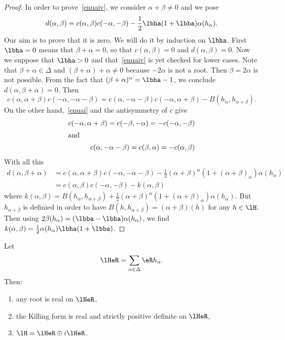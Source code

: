 \begin{proof}
	In order to prove~\ref{enuaiv}, we consider $\alpha+\beta\neq0$ and we pose
	\[
		d(\alpha,\beta)=c(\alpha,\beta)c(-\alpha,-\beta)-\frac{1}{2}\lbha(1+\lbba)\alpha(h_{\alpha}).
	\]
	Our aim is to prove that it is zero. We will do it by induction on $\lbha$. First $\lbha=0$ means that $\beta+\alpha=0$, so that $c(\alpha,\beta)=0$ and $d(\alpha,\beta)=0$. Now we suppose that $\lbha>0$ and that~\ref{enuaiv} is yet checked for lower cases. Note that $\beta+\alpha\in \Delta$ and $(\beta+\alpha)+\alpha\neq 0$ because $-2\alpha$ is not a root. Then $\beta=2\alpha$ is not possible. From the fact that $(\beta+\alpha)^{\alpha}=\lbha-1$, we conclude $d(\alpha,\beta+\alpha)=0$. Then
	\[
		c(\alpha,\alpha+\beta)c(-\alpha,-\alpha-\beta)=c(\alpha,-\alpha-\beta)c(-\alpha,\alpha+\beta)-B(h_{\alpha},h_{\alpha+\beta}).
	\]
	On the other hand,~\ref{enuai} and the antisymmetry of $c$ give
	\begin{subequations}
		\begin{align}
			c(-\alpha,\alpha+\beta)=c(-\beta,-\alpha)=-c(-\alpha,-\beta) \\
			\intertext{and}
			c(\alpha,-\alpha-\beta)=c(\beta,\alpha)=-c(\alpha,\beta)
		\end{align}
	\end{subequations}
	With all this
	\begin{equation}
		\begin{split}
			d(\alpha,\beta+\alpha)&=c(\alpha,\alpha+\beta)c(-\alpha,-\alpha-\beta)-\frac{1}{2}(\alpha+\beta)^{\alpha}(1+(\alpha+\beta)_{\alpha})\alpha(h_{\alpha})\\
			&=c(\alpha,\beta)c(-\alpha,-\beta)-k(\alpha,\beta)
		\end{split}
	\end{equation}
	where $k(\alpha,\beta)=B(h_{\alpha},h_{\alpha+\beta})+\frac{1}{2}(\alpha+\beta)^{\alpha}(1+(\alpha+\beta)_{\alpha})\alpha(h_{\alpha})$. But $h_{\alpha+\beta}$ is definied in order to have $B(h,h_{\alpha+\beta})=(\alpha+\beta)(h)$ for any $h\in\lH$. Then using $2\beta(h_{\alpha})=(\lbba-\lbha)\alpha(h_{\alpha})$, we find $k(\alpha,\beta)=\frac{1}{2}\alpha(h_{\alpha})\lbha(1+\lbba)$.
\end{proof}

\begin{proposition}\label{prop:lHeR}
	Let
	\begin{equation}
		\lHeR=\sum_{\alpha\in\Delta}\eR h_{\alpha}.
	\end{equation}
	Then:
	\begin{enumerate}
		\item any root is real on $\lHeR$,
		\item the Killing form is real and strictly positive definite on $\lHeR$,
		\item $\lH=\lHeR\oplus i\lHeR$.
	\end{enumerate}
\end{proposition}

